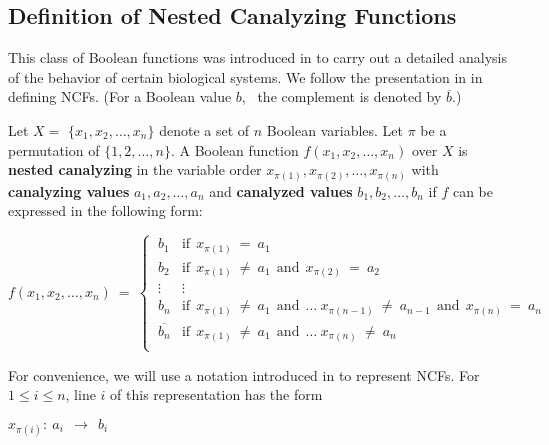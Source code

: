 \bigskip

\subsection{Definition of Nested Canalyzing Functions}

\medskip

This class of Boolean functions 
was introduced in \cite{Kauffman-etal-2003} to carry out a detailed
analysis of the behavior of certain biological systems.
We follow the presentation in \cite{Layne-2011} in defining NCFs.
(For a Boolean value $b$,~ the complement is denoted by $\overline{b}$.)

\begin{definition}\label{def:nested_canalyzing}
Let $X = $ $\{x_1, x_2, \ldots, x_n\}$ denote a set of $n$  Boolean variables.
Let $\pi$ be a permutation of $\{1, 2, \ldots, n\}$.
A Boolean function $f(x_1, x_2, \ldots, x_n)$ over $X$ is \textbf{nested canalyzing}
in the variable order $x_{\pi(1)}, x_{\pi(2)}, \ldots, x_{\pi(n)}$ with
\textbf{canalyzing values} $a_1, a_2, \ldots, a_n$ and
\textbf{canalyzed values} $b_1, b_2, \ldots, b_n$
if $f$ can be expressed in the following form:

\medskip
\[
f(x_1, x_2, \ldots, x_n) ~=~ 
   \begin{cases}
       \:b_1 & \mathrm{if~~} x_{\pi(1)} ~=~ a_1 \\
       \:b_2 & \mathrm{if~~} x_{\pi(1)} ~\neq~ a_1 \mathrm{~~and~~}
            x_{\pi(2)} ~=~ a_2 \\
       \:\vdots & \vdots \\
       \:b_n & \mathrm{if~~} x_{\pi(1)} ~\neq~ a_1 \mathrm{~~and~~} \ldots~
             x_{\pi(n-1)} ~\neq~ a_{n-1} \mathrm{~~and~~} x_{\pi(n)} ~=~ a_n \\
       \:\overline{b_n} & \mathrm{if~~} x_{\pi(1)} ~\neq~ a_1 \mathrm{~~and~~} \ldots~
            x_{\pi(n)} ~\neq~ a_n \\
   \end{cases}
\]
\end{definition}

For convenience, we will use a notation introduced in \cite{Stearns-etal-2018}
to represent NCFs.
For $1 \leq i \leq n$, line $i$ of this representation has the form

\medskip

\noindent
\hspace*{1.1in} $x_{\pi(i)}:~ a_i ~~\longrightarrow~~ b_i$

\medskip

